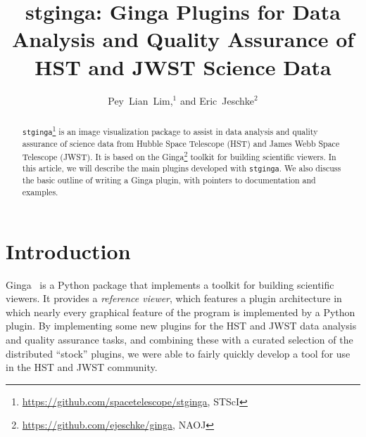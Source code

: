 \documentclass[11pt,twoside]{article}
\begin{document}
\title{stginga: Ginga Plugins for Data Analysis and Quality Assurance of HST and JWST Science Data}

\author{Pey~Lian~Lim,$^1$ and Eric~Jeschke$^2$
  }




\begin{abstract}

{\tt stginga}\footnote{\url{https://github.com/spacetelescope/stginga}, STScI}
is an image visualization package to assist
in data analysis and quality assurance of science data from Hubble Space
Telescope (HST) and James Webb Space Telescope (JWST).  It is based on the
Ginga\footnote{\url{https://github.com/ejeschke/ginga}, NAOJ} toolkit for
building scientific viewers.
In this article, we will describe the main plugins developed
with {\tt stginga}.  We also discuss the
basic outline of writing a Ginga plugin, with pointers to documentation
and examples.

\end{abstract}

\section{Introduction}

Ginga~\citep{Jeschke15A} is a Python package that
implements a toolkit for building scientific viewers.  It provides
a \emph{reference viewer}, which features
a plugin architecture in which nearly every graphical feature of the
program is implemented by a Python plugin.
By implementing some new plugins for the HST and JWST data analysis and
quality assurance tasks, and combining these with a curated selection of
the distributed ``stock'' plugins, we were able to fairly quickly
develop a tool for use in the HST and JWST community.
\end{document}
